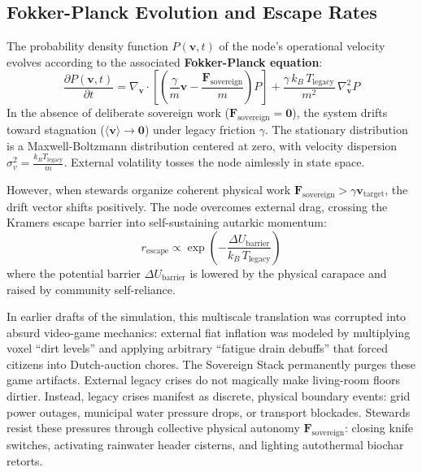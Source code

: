 \subsection{Fokker-Planck Evolution and Escape Rates}
The probability density function $P(\mathbf{v}, t)$ of the node's operational velocity evolves according to the associated \textbf{Fokker-Planck equation}:
\begin{equation}
\frac{\partial P(\mathbf{v}, t)}{\partial t} = \nabla_{\mathbf{v}} \cdot \left[ \left( \frac{\gamma}{m} \mathbf{v} - \frac{\mathbf{F}_{\mathrm{sovereign}}}{m} \right) P \right] + \frac{\gamma \, k_B \, T_{\mathrm{legacy}}}{m^2} \, \nabla_{\mathbf{v}}^2 P
\label{eq:fokker_planck}
\end{equation}
In the absence of deliberate sovereign work ($\mathbf{F}_{\mathrm{sovereign}} = \mathbf{0}$), the system drifts toward stagnation ($\langle \mathbf{v} \rangle \to \mathbf{0}$) under legacy friction $\gamma$. The stationary distribution is a Maxwell-Boltzmann distribution centered at zero, with velocity dispersion $\sigma_v^2 = \frac{k_B T_{\mathrm{legacy}}}{m}$. External volatility tosses the node aimlessly in state space.

However, when stewards organize coherent physical work $\mathbf{F}_{\mathrm{sovereign}} > \gamma \mathbf{v}_{\mathrm{target}}$, the drift vector shifts positively. The node overcomes external drag, crossing the Kramers escape barrier into self-sustaining autarkic momentum:
\begin{equation}
r_{\mathrm{escape}} \propto \exp\left( -\frac{\Delta U_{\mathrm{barrier}}}{k_B \, T_{\mathrm{legacy}}} \right)
\label{eq:kramers_escape}
\end{equation}
where the potential barrier $\Delta U_{\mathrm{barrier}}$ is lowered by the physical carapace and raised by community self-reliance.

In earlier drafts of the simulation, this multiscale translation was corrupted into absurd video-game mechanics: external fiat inflation was modeled by multiplying voxel ``dirt levels'' and applying arbitrary ``fatigue drain debuffs'' that forced citizens into Dutch-auction chores. The Sovereign Stack permanently purges these game artifacts. External legacy crises do not magically make living-room floors dirtier. Instead, legacy crises manifest as discrete, physical boundary events: grid power outages, municipal water pressure drops, or transport blockades. Stewards resist these pressures through collective physical autonomy $\mathbf{F}_{\mathrm{sovereign}}$: closing knife switches, activating rainwater header cisterns, and lighting autothermal biochar retorts.

